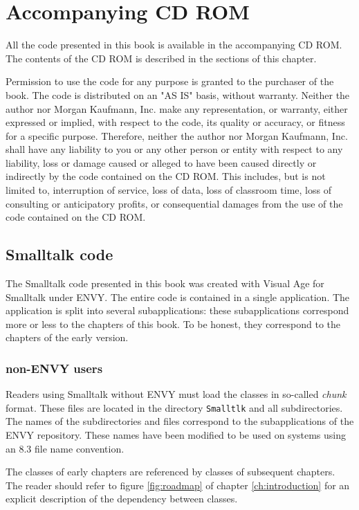 \documentclass[twoside]{book}
\begin{document}
\fi

\chapter{Accompanying CD ROM}
All the code presented in this book is available in the
accompanying CD ROM. The contents of the CD ROM is described in
the sections of this chapter.

Permission to use the code for any purpose is granted to the
purchaser of the book. The code is distributed on an "AS IS"
basis, without warranty. Neither the author nor Morgan Kaufmann,
Inc. make any representation, or warranty, either expressed or
implied, with respect to the code, its quality or accuracy, or
fitness for a specific purpose. Therefore, neither the author nor
Morgan Kaufmann, Inc. shall have any liability to you or any other
person or entity with respect to any liability, loss or damage
caused or alleged to have been caused directly or indirectly by
the code contained on the CD ROM. This includes, but is not
limited to, interruption of service, loss of data, loss of
classroom time, loss of consulting or anticipatory profits, or
consequential damages from the use of the code contained on the CD
ROM.

\section{Smalltalk code}
The Smalltalk code presented in this book was created with Visual
Age for Smalltalk under ENVY. The entire code is contained in a
single application. The application is split into several
subapplications: these subapplications correspond more or less to
the chapters of this book. To be honest, they correspond to the
chapters of the early version.
\subsection{non-ENVY users}
Readers using Smalltalk without ENVY must load the classes in
so-called {\it chunk} format. These files are located in the
directory {\tt Smalltlk} and all subdirectories. The names of the
subdirectories and files correspond to the subapplications of the
ENVY repository. These names have been modified to be used on
systems using an 8.3 file name convention.

The classes of early chapters are referenced by classes of
subsequent chapters. The reader should refer to figure
\ref{fig:roadmap} of chapter \ref{ch:introduction} for an explicit
description of the dependency between classes.
\end{document}
